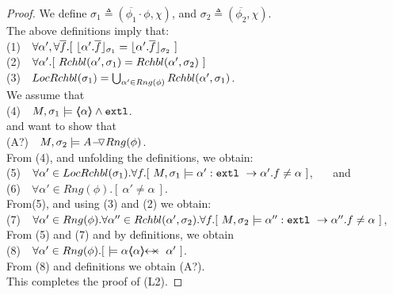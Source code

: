 \begin{proof}
 We define $\sigma_1 \triangleq (\overline {\phi_1}\cdot \phi,\chi)$, and  $\sigma_2 \triangleq (\overline {\phi_2},\chi) $.\\
The above definitions imply that: \\
\SP (1)\ \ $\forall \alpha',\forall \overline f.[\  \interpret {\sigma_1} {\alpha'.\overline f} =  \interpret {\sigma_2} {\alpha'.\overline f}\ ]$\\
\SP (2)\ \ $\forall \alpha'.[\  \Relevant {\alpha'} {\sigma_1} = \Relevant {\alpha'} {\sigma_2}\ ]$\\
\SP (3)\ \ $\LRelevantO {\sigma_1} = \bigcup_{\alpha'\in Rng(\phi)} \Relevant {\alpha'} {\sigma_1}$.\\
We   assume that\\
\SP (4)\ \  $M, \sigma_1 \models \inside \alpha \wedge \extThis$.\\
and want to show that\\
\SP (A?)\ \ $M, \sigma_2 \models \PushASLong  {Rng(\phi)} {A}$.\\
From (4), and unfolding the definitions, we obtain:\\
\SP (5)\ \  $\forall \alpha'\in \LRelevantO {\sigma_1}.\forall f.[ \   M, \sigma_1 \models \alpha':\prg{extl}\ \rightarrow \alpha'.f  \neq \alpha\ ]$, \ \ \ and\\
\SP (6)\ \ $\forall \alpha'\in Rng (\phi). [ \ \alpha'\neq \alpha \ ]$.\\
From(5), and using (3) and (2) we obtain:
\\
\SP (7)\ \  $\forall \alpha'\in Rng(\phi).\forall \alpha'' \in\Relevant {\alpha'} {\sigma_2}.\forall f.[ \   M, \sigma_2 \models \alpha'':\prg{extl}\ \rightarrow \alpha''.f  \neq \alpha\ ]$,
From (5) and (7) and by definitions, we obtain
\\
\SP (8)\ \  $\forall \alpha'\in Rng (\phi).[ \   \models \alpha \protectedFrom \alpha {\alpha'}\ ]$.\\
From (8) and definitions we obtain (A?).\\
This completes the proof of (L2). 
\end{proof}


